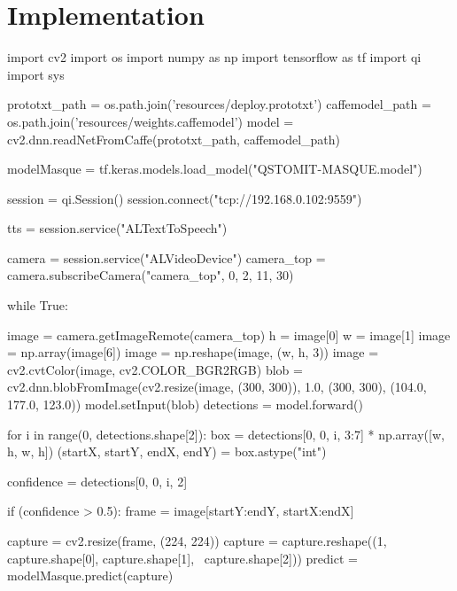 \documentclass{cubeamer}
\newcommand{\tab}{\- \- \- \-}
\begin{document}
\section{Implementation}

\begin{frame}[fragile]
\begin{semiverbatim}
import cv2
import os
import numpy as np
import tensorflow as tf
import qi
import sys

prototxt_path = os.path.join('resources/deploy.prototxt')
caffemodel_path = os.path.join('resources/weights.caffemodel')
model = cv2.dnn.readNetFromCaffe(prototxt_path, caffemodel_path)

modelMasque = tf.keras.models.load_model("QSTOMIT-MASQUE.model")
	\end{semiverbatim}
	
\end{frame}

\begin{frame}[fragile]
\begin{semiverbatim}
session = qi.Session()
session.connect("tcp://192.168.0.102:9559")

tts = session.service("ALTextToSpeech")

camera = session.service("ALVideoDevice")
camera_top = camera.subscribeCamera("camera_top", 0, 2, 11, 30)
\end{semiverbatim}
\end{frame}

\begin{frame}[fragile]
\begin{semiverbatim}
while True:

\tab image = camera.getImageRemote(camera_top)
\tab h = image[0]
\tab w = image[1]
\tab image = np.array(image[6])
\tab image = np.reshape(image, (w, h, 3))
\tab image = cv2.cvtColor(image, cv2.COLOR_BGR2RGB)
\tab blob = cv2.dnn.blobFromImage(cv2.resize(image, (300, 300)), 1.0, 
\tab \tab \tab (300, 300), (104.0, 177.0, 123.0))
\tab model.setInput(blob)
\tab detections = model.forward()
\end{semiverbatim}
\end{frame}

\begin{frame}[fragile]
\begin{semiverbatim}
for i in range(0, detections.shape[2]):
\tab box = detections[0, 0, i, 3:7] * np.array([w, h, w, h])
\tab (startX, startY, endX, endY) = box.astype("int")

\tab confidence = detections[0, 0, i, 2]

\tab if (confidence > 0.5):
\tab \tab frame = image[startY:endY, startX:endX]

\tab \tab capture = cv2.resize(frame, (224, 224))
\tab \tab capture = capture.reshape((1, capture.shape[0], capture.shape[1],\ \tab \tab \tab \tab \tab capture.shape[2]))
\tab \tab predict = modelMasque.predict(capture)
\end{semiverbatim}
\end{frame}
\end{document}
